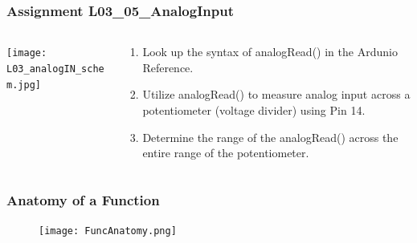 \documentclass{beamer}
\begin{document}
\begin{frame}\frametitle{Assignment L03\_05\_AnalogInput}
\begin{columns}
\begin{column}{4cm}
\begin{overprint}
\texttt{[image: L03\_analogIN\_schem.jpg]}
\end{overprint}
\end{column}
\begin{column}{6cm}
\begin{enumerate}
\item Look up the syntax of analogRead() in the Ardunio Reference. 
\item Utilize analogRead() to measure analog input across a potentiometer (voltage divider) using Pin 14. 
\item Determine the range of the analogRead() across the entire range of the potentiometer. 
\end{enumerate}
\end{column}
\end{columns}
\end{frame}

\begin{frame}\frametitle{Anatomy of a Function}
\begin{figure}[h]
	\texttt{[image: FuncAnatomy.png]}
\end{figure}
\end{frame}
\end{document}
